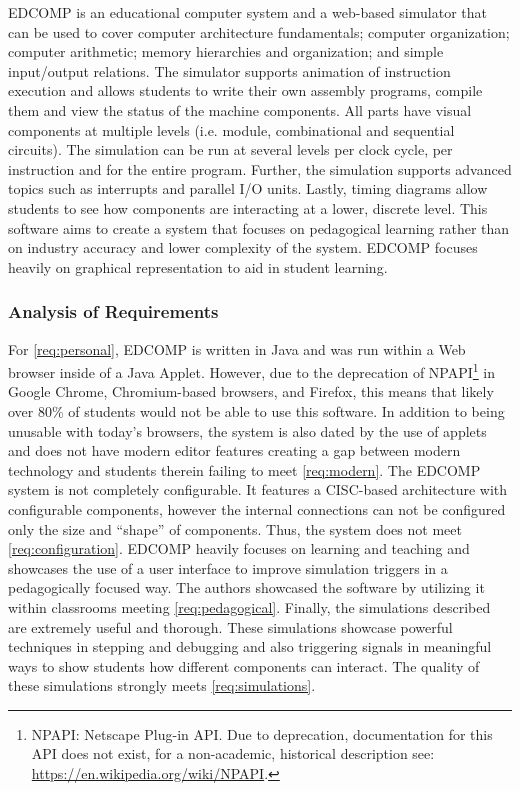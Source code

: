 EDCOMP is an educational computer system and a web-based simulator that can be used to cover computer architecture fundamentals; computer organization; computer arithmetic; memory hierarchies and organization; and simple input/output relations\cite{Djordjevic2005}. The simulator supports animation of instruction execution and allows students to write their own assembly programs, compile them and view the status of the machine components. All parts have visual components at multiple levels (i.e. module, combinational and sequential circuits). The simulation can be run at several levels per clock cycle, per instruction and for the entire program. Further, the simulation supports advanced topics such as interrupts and parallel I/O units. Lastly, timing diagrams allow students to see how components are interacting at a lower, discrete level. This software aims to create a system that focuses on pedagogical learning rather than on industry accuracy and lower complexity of the system. EDCOMP focuses heavily on graphical representation to aid in student learning.

\subsubsection*{Analysis of Requirements}

For \cref{req:personal}, EDCOMP is written in Java and was run within a Web browser inside of a Java Applet. However, due to the deprecation of NPAPI\footnote{NPAPI: Netscape Plug-in API. Due to deprecation, documentation for this API does not exist, for a non-academic, historical description see: \url{https://en.wikipedia.org/wiki/NPAPI}.} in Google Chrome, Chromium-based browsers, and Firefox, this means that likely over 80\% of students would not be able to use this software\cite{StatCounterBrowsers2017, W3SchoolsBrowsers2017, OracleJavaApplet2017, ChromiumBlogNPAPI2013, MozillaBlogNPAPI2016, GoogleChromeHelp2015}. In addition to being unusable with today's browsers, the system is also dated by the use of applets and does not have modern editor features creating a gap between modern technology and students therein failing to meet \cref{req:modern}. The EDCOMP system is not completely configurable. It features a CISC-based architecture with configurable components, however the internal connections can not be configured only the size and ``shape'' of components. Thus, the system does not meet \cref{req:configuration}. EDCOMP heavily focuses on learning and teaching and showcases the use of a user interface to improve simulation triggers in a pedagogically focused way. The authors showcased the software by utilizing it within classrooms meeting \cref{req:pedagogical}. Finally, the simulations described are extremely useful and thorough. These simulations showcase powerful techniques in stepping and debugging and also triggering signals in meaningful ways to show students how different components can interact. The quality of these simulations strongly meets \cref{req:simulations}. 

